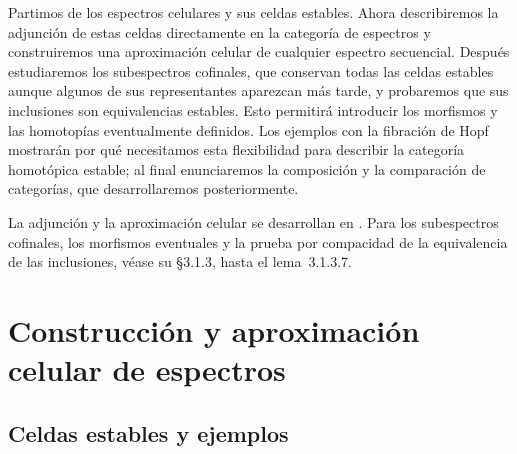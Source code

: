 
Partimos de los espectros celulares y sus celdas estables. Ahora describiremos la adjunción de estas celdas directamente en la categoría de espectros y construiremos una aproximación celular de cualquier espectro secuencial. Después estudiaremos los subespectros cofinales, que conservan todas las celdas estables aunque algunos de sus representantes aparezcan más tarde, y probaremos que sus inclusiones son equivalencias estables. Esto permitirá introducir los morfismos y las homotopías eventualmente definidos. Los ejemplos con la fibración de Hopf mostrarán por qué necesitamos esta flexibilidad para describir la categoría homotópica estable; al final enunciaremos la composición y la comparación de categorías, que desarrollaremos posteriormente.

La adjunción y la aproximación celular se desarrollan en \cite[\S2.6.2, especialmente teorema~2.6.2.4]{malkiewich}. Para los subespectros cofinales, los morfismos eventuales y la prueba por compacidad de la equivalencia de las inclusiones, véase su \S3.1.3, hasta el lema~3.1.3.7.

\section{Construcción y aproximación celular de espectros}

\subsection{Celdas estables y ejemplos}

